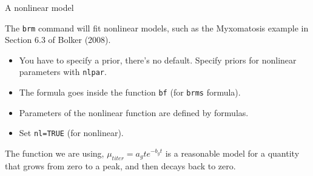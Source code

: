\documentclass[
  ignorenonframetext,
]{beamer}
\newenvironment{Shaded}{\begin{snugshade}}{\end{snugshade}}
\newcommand{\DataTypeTok}[1]{\textcolor[rgb]{0.13,0.29,0.53}{#1}}
\newcommand{\DecValTok}[1]{\textcolor[rgb]{0.00,0.00,0.81}{#1}}
\newcommand{\FloatTok}[1]{\textcolor[rgb]{0.00,0.00,0.81}{#1}}
\newcommand{\KeywordTok}[1]{\textcolor[rgb]{0.13,0.29,0.53}{\textbf{#1}}}
\newcommand{\NormalTok}[1]{#1}
\newcommand{\OperatorTok}[1]{\textcolor[rgb]{0.81,0.36,0.00}{\textbf{#1}}}
\newcommand{\OtherTok}[1]{\textcolor[rgb]{0.56,0.35,0.01}{#1}}
\newcommand{\StringTok}[1]{\textcolor[rgb]{0.31,0.60,0.02}{#1}}
\providecommand{\tightlist}{%
  \setlength{\itemsep}{0pt}\setlength{\parskip}{0pt}}
\begin{document}
\begin{frame}[fragile]{A nonlinear model}
\protect\hypertarget{a-nonlinear-model}{}

The \texttt{brm} command will fit nonlinear models, such as the
Myxomatosis example in Section 6.3 of Bolker (2008).

\begin{itemize}
\tightlist
\item
  You have to specify a prior, there's no default. Specify priors for
  nonlinear parameters with \texttt{nlpar}.
\item
  The formula goes inside the function \texttt{bf} (for \texttt{brms}
  formula).
\item
  Parameters of the nonlinear function are defined by formulas.
\item
  Set \texttt{nl=TRUE} (for nonlinear).
\end{itemize}

\scriptsize

\begin{Shaded}
\end{Shaded}

\normalsize

The function we are using, \(\mu_{titer}=a_{g}te^{-b_{g}t}\) is a
reasonable model for a quantity that grows from zero to a peak, and then
decays back to zero.

\end{frame}
\end{document}
